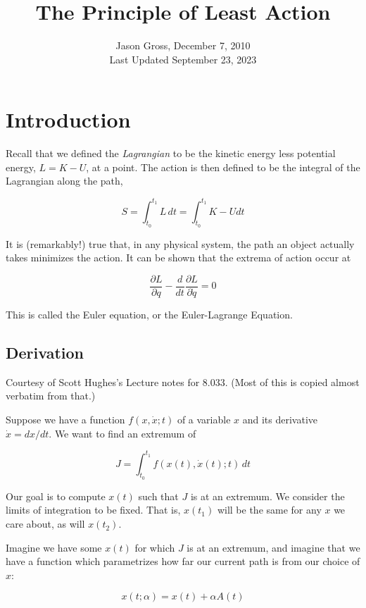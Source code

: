 \documentclass{article}
\begin{document}
\title{The Principle of Least Action}
\author{Jason Gross, December 7, 2010\\
Last Updated September 23, 2023}
\date{}
\maketitle

\section*{Introduction}

Recall that we defined the \textit{ Lagrangian} to be the kinetic energy less potential energy, \(L=K-U\), at a point. { }The action is then defined
to be the integral of the Lagrangian along the path,

\[S=\int_{t_0}^{t_1} L \, dt=\int _{t_0}^{t_1}K-Udt\]

It is (remarkably!) true that, in any physical system, the path an object actually takes minimizes the action. { }It can be shown that the extrema
of action occur at

\[\frac{\partial L}{\partial q}-\frac{d}{dt}\frac{\partial L}{\partial \dot{q}}=0\]

This is called the Euler equation, or the Euler-Lagrange Equation.

\subsection*{Derivation}

Courtesy of Scott Hughes{'}s Lecture notes for 8.033. { }(Most of this is copied almost verbatim from that.)

Suppose we have a function \(f\left(x,\dot{x};t\right)\) of a variable \(x\) and its derivative \(\dot{x}=dx/dt\). { }We want to find an extremum
of 

\[J=\int_{t_0}^{t_1} f\left(x(t),\dot{x}(t);t\right) \, dt\]

Our goal is to compute \(x(t)\) such that \(J\) is at an extremum. { }We consider the limits of integration to be fixed. { }That is, \(x\left(t_1\right)\)
will be the same for any \(x\) we care about, as will \(x\left(t_2\right)\).

Imagine we have some \(x(t)\) for which \(J\) is at an extremum, and imagine that we have a function which parametrizes how far our current path
is from our choice of \(x\):

\[x(t;\alpha )=x(t)+\alpha  A(t)\]
\end{document}
